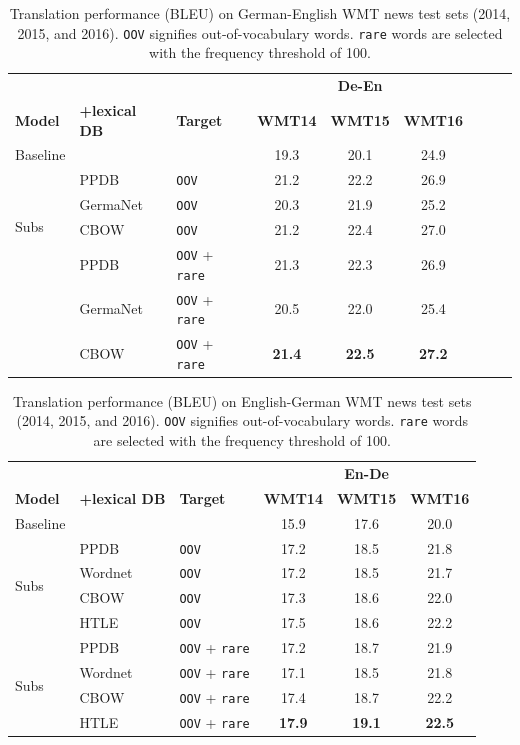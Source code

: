 \begin{table}[htb!]
\centering
\caption{Translation performance (BLEU) on German-English WMT news test sets (2014, 2015, and 2016). \texttt{OOV} signifies out-of-vocabulary words. \texttt{rare} words are selected with the frequency threshold of 100. \label{semdeen}}
\begin{tabular}{lllcccccc}
\toprule
   & & & \multicolumn{3}{c}{\textbf{De-En}}  \\\cline{4-6} 
\rule{0pt}{2.5ex} \textbf{Model} & \textbf{+lexical DB} & \textbf{Target}  & \bf WMT14 &  \bf WMT15 &  \bf WMT16 \\      
 \midrule
Baseline &  &  &    19.3 &   20.1 &  24.9   \\ \midrule
\multirow{4}{*}{Subs}  & {PPDB}  & \texttt{OOV} & 21.2 & 22.2 & 26.9 \\
& {GermaNet}   & \texttt{OOV}  & 20.3 & 21.9 & 25.2 \\
& {CBOW}   & \texttt{OOV}  & 21.2 & 22.4& 27.0 \\
\midrule
\multirow{4}{*}{Subs} & {PPDB}   & \texttt{OOV} + \texttt{rare}   & 21.3 & 22.3 & 26.9 \\
& {GermaNet}   & \texttt{OOV} + \texttt{rare}     & 20.5 & 22.0 & 25.4 \\
& {CBOW}   & \texttt{OOV} + \texttt{rare}  & \bf 21.4 & \bf 22.5& \bf 27.2 \\
\bottomrule
\end{tabular}
\end{table}
\begin{table}[htb!]
\centering
\caption{Translation performance (BLEU) on English-German WMT news test sets (2014, 2015, and 2016). \texttt{OOV} signifies out-of-vocabulary words. \texttt{rare} words are selected with the frequency threshold of 100. \label{semende}}
\begin{tabular}{lllccc}
\toprule
   & & & \multicolumn{3}{c}{\textbf{En-De}}   \\\cline{4-6} 
\rule{0pt}{2.5ex} \textbf{Model}  & \textbf{+lexical DB} & \textbf{Target} &  \bf WMT14 &  \bf WMT15 &  \bf WMT16 \\      
 \midrule
Baseline  & & & 15.9 &  17.6 &  20.0       \\ \midrule
\multirow{4}{*}{Subs} & {PPDB} & \texttt{OOV}     & 17.2 &  	18.5   	 & 21.8   \\
& {Wordnet}& \texttt{OOV}      & 17.2 &  	18.5   	& 21.7 \\
& {CBOW}& \texttt{OOV}      & 17.3 &  	18.6   	& 22.0 \\
& {HTLE}   & \texttt{OOV}  & 17.5 & 18.6 & 22.2 \\ \midrule
\multirow{4}{*}{Subs} & {PPDB}  & \texttt{OOV} + \texttt{rare}    & 17.2 &  	18.7   	 & 21.9  \\
& {Wordnet} & \texttt{OOV} + \texttt{rare}     & 17.1 &  	18.5   	& 21.8  \\
& {CBOW} & \texttt{OOV} + \texttt{rare}     & 17.4 &  	18.7   	& 22.2  \\
& {HTLE}   & \texttt{OOV} + \texttt{rare}  & \bf 17.9 &  	\bf 19.1   	& \bf 22.5  \\
\bottomrule
\end{tabular}
\end{table}

